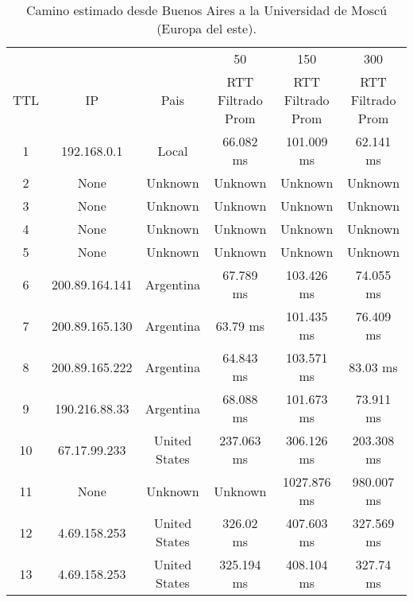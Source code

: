 \begin{table}[H]
\centering
\caption{Camino estimado desde Buenos Aires a la Universidad de Moscú (Europa del este).}
\begin{tabular}{ | c | c | c | c | c | c | }
\hline
 & & & 50 & 150 & 300 \\ %
TTL	&         IP    &     	        Pais     &   	 RTT Filtrado Prom&  	 RTT Filtrado Prom&  	 RTT Filtrado Prom  \\ \hline
1	&192.168.0.1    &     	       Local     &   	      66.082 ms   &  	     101.009 ms   &  	      62.141 ms \\ \hline    
2	&None           &     	      Unknown    &   	      Unknown     &  	      Unknown     &  	      Unknown   \\ \hline    
3	&None           &     	      Unknown    &   	      Unknown     &  	      Unknown     &  	      Unknown   \\ \hline    
4	&None           &     	      Unknown    &   	      Unknown     &  	      Unknown     &  	      Unknown   \\ \hline    
5	&None           &     	      Unknown    &   	      Unknown     &  	      Unknown     &  	      Unknown   \\ \hline    
6	&200.89.164.141 &     	     Argentina   &   	      67.789 ms   &  	     103.426 ms   &  	      74.055 ms \\ \hline    
7	&200.89.165.130 &     	     Argentina   &   	       63.79 ms   &  	     101.435 ms   &  	      76.409 ms \\ \hline    
8	&200.89.165.222 &     	     Argentina   &   	      64.843 ms   &  	     103.571 ms   &  	       83.03 ms \\ \hline    
9	&190.216.88.33  &     	     Argentina   &   	      68.088 ms   &  	     101.673 ms   &  	      73.911 ms \\ \hline    
10	&67.17.99.233   &     	   United States &   	     237.063 ms   &  	     306.126 ms   &  	     203.308 ms \\ \hline    
11	&None           &     	      Unknown    &   	      Unknown     &  	    1027.876 ms   &  	     980.007 ms \\ \hline    
12	&4.69.158.253   &     	   United States &   	      326.02 ms   &  	     407.603 ms   &  	     327.569 ms \\ \hline    
13	&4.69.158.253   &     	   United States &   	     325.194 ms   &  	     408.104 ms   &  	      327.74 ms \\ \hline    

\end{tabular}
\end{table}
